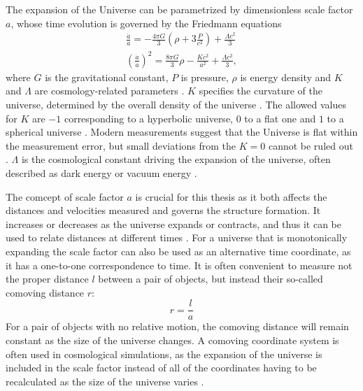 \documentclass[english, oneside]{HYgradu}
\begin{document}
The expansion of the Universe can be parametrized by dimensionless scale factor $a$, whose time evolution is governed by the Friedmann equations
\begin{align}\label{friedmann1}
\frac{\ddot{a}}{a} = -\frac{4\pi G}{3} \left( \rho + 3 \frac{P}{c^2} \right) + \frac{\Lambda c^2}{3} \\ \label{friedmann2}
{\left( \frac{\dot{a}}{a} \right)}^2 = \frac{8\pi G}{3}\rho - \frac{Kc^2}{a^2} + \frac{\Lambda c^2}{3},
\end{align}
where $G$ is the gravitational constant, $P$ is pressure, $\rho$ is energy density and $K$ and $\Lambda$ are cosmology-related parameters \citep{mo2010galaxy}. $K$ specifies the curvature of the universe, determined by the overall density of the universe \citep{mo2010galaxy}. The allowed values for $K$ are $-1$ corresponding to a hyperbolic universe, $0$ to a flat one and $1$ to a spherical universe \citep{mo2010galaxy}. Modern measurements suggest that the Universe is flat within the measurement error, but small deviations from the $K=0$ cannot be ruled out \citep{planck2016resultsI}. $\Lambda$ is the cosmological constant driving the expansion of the universe, often described as dark energy or vacuum energy \citep{mo2010galaxy}.

The comcept of scale factor $a$ is crucial for this thesis as it both affects the distances and velocities measured and governs the structure formation. It increases or decreases as the universe expands or contracts, and thus it can be used to relate distances at different times \citep{mo2010galaxy}. For a universe that is monotonically expanding the scale factor can also be used as an alternative time coordinate, as it has a one-to-one correspondence to time. It is often convenient to measure not the proper distance $l$ between a pair of objects, but instead their so-called comoving distance $r$: \citep{mo2010galaxy}
\begin{equation} \label{comoving}
r = \frac{l}{a}
\end{equation}
For a pair of objects with no relative motion, the comoving distance will remain constant as the size of the universe changes. A comoving coordinate system is often used in cosmological simulations, as the expansion of the universe is included in the scale factor instead of all of the coordinates having to be recalculated as the size of the universe varies \citep{griebel1002numerical}.
\end{document}
